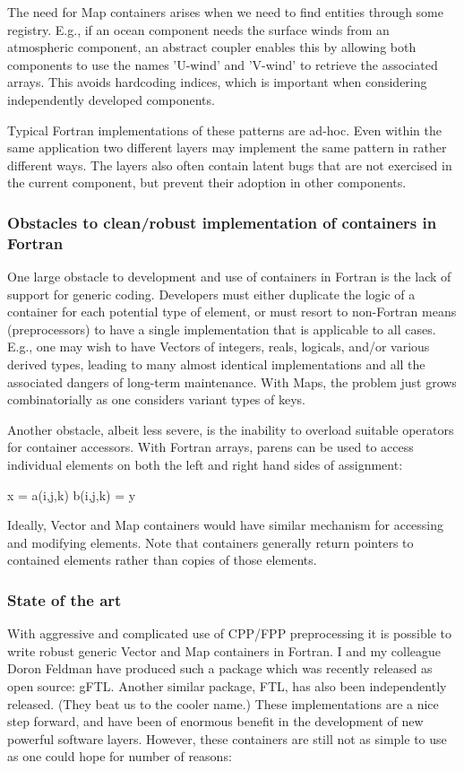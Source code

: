 \documentclass{article}
\begin{document}
The need for Map containers arises when we need to find entities
through some registry.  E.g., if an ocean component needs the surface
winds from an atmospheric component, an abstract coupler enables this
by allowing both components to use the names 'U-wind' and 'V-wind' to
retrieve the associated arrays.  This avoids hardcoding indices, which
is important when considering independently developed components.

Typical Fortran implementations of these patterns are ad-hoc.  Even
within the same application two different layers may implement the
same pattern in rather different ways.  The layers also often contain
latent bugs that are not exercised in the current component, but
prevent their adoption in other components.


\subsubsection{Obstacles to clean/robust implementation of containers in Fortran}

One large obstacle to development and use of containers in Fortran is
the lack of support for generic coding.  Developers must either
duplicate the logic of a container for each potential type of element,
or must resort to non-Fortran means (preprocessors) to have a single
implementation that is applicable to all cases.  E.g., one may wish to
have Vectors of integers, reals, logicals, and/or various derived
types, leading to many almost identical implementations and all the
associated dangers of long-term maintenance.  With Maps, the problem
just grows combinatorially as one considers variant types of keys.

Another obstacle, albeit less severe, is the inability to overload
suitable operators for container accessors.  With Fortran arrays,
parens can be used to access individual elements on both the left and
right hand sides of assignment:

      x = a(i,j,k)
      b(i,j,k) = y


Ideally, Vector and Map containers would have similar mechanism for
accessing and modifying elements.  Note that containers generally
return pointers to contained elements rather than copies of those
elements.


\subsubsection{State of the art}

With aggressive and complicated use of CPP/FPP preprocessing it is
possible to write robust generic Vector and Map containers in Fortran.
I and my colleague Doron Feldman have produced such a package which
was recently released as open source: gFTL.  Another similar package,
FTL, has also been independently released.  (They beat us to the
cooler name.)  These implementations are a nice step forward, and have
been of enormous benefit in the development of new powerful software
layers.  However, these containers are still not as simple to use as
one could hope for number of reasons:
\end{document}
